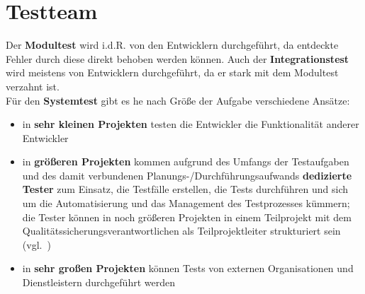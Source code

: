 \section{Testteam}
Der \textbf{Modultest} wird i.d.R. von den Entwicklern durchgeführt, da entdeckte Fehler durch diese direkt behoben werden können.
Auch der \textbf{Integrationstest} wird meistens von Entwicklern durchgeführt, da er stark mit dem Modultest verzahnt ist.\\

\noindent
Für den \textbf{Systemtest} gibt es he nach Größe der Aufgabe verschiedene Ansätze:

\begin{itemize}
    \item in \textbf{sehr kleinen Projekten} testen die Entwickler die Funktionalität anderer Entwickler
    \item in \textbf{größeren Projekten} kommen aufgrund des Umfangs der Testaufgaben und des damit verbundenen Planungs-/Durchführungsaufwands \textbf{dedizierte Tester} zum Einsatz, die Testfälle erstellen, die Tests durchführen und sich um die Automatisierung und das Management des Testprozesses kümmern; die Tester können in noch größeren Projekten in einem Teilprojekt mit dem Qualitätssicherungsverantwortlichen als Teilprojektleiter strukturiert sein (vgl.~\cite[71]{Wed09c})
    \item in \textbf{sehr großen Projekten} können Tests von externen Organisationen und Dienstleistern durchgeführt werden
\end{itemize}
